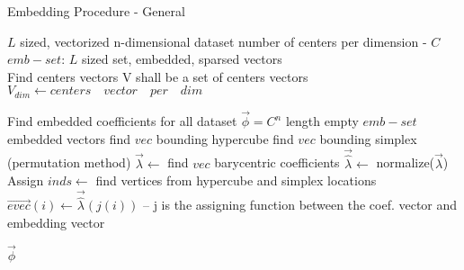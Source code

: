 \documentclass{article}
\begin{document}
	
	\begin{algorithm}
		\caption{Embedding Procedure - General}
		\begin{algorithmic}[1]
			
			\REQUIRE $L$ sized, vectorized n-dimensional dataset
			\REQUIRE number of centers per dimension - $C$
			\ENSURE $emb-set$: $L$ sized set, embedded, sparsed vectors\\
			
			\STATE Find centers vectors
			\STATE V shall be a set of centers vectors
			\STATE $V_{dim} \leftarrow centers \quad vector \quad per \quad dim$
			\ENDFOR
			
			\STATE Find embedded coefficients for all dataset
			\STATE $\overrightarrow{\phi} = C^n$ length empty $emb-set$ embedded vectors
			\STATE find $vec$ bounding hypercube 
			\STATE find $vec$ bounding simplex (permutation method)
			\STATE $\overrightarrow{\lambda} \leftarrow$ find $vec$ barycentric coefficients 
			\STATE $\overrightarrow{\hat{\lambda}} \leftarrow$ normalize($\overrightarrow{\lambda}$)
			\ENDFOR
			\STATE Assign
			\STATE $inds \leftarrow$ find vertices from hypercube and simplex locations
			\STATE $\overrightarrow{evec}(i) \leftarrow \overrightarrow{\hat{\lambda}}(j(i))$ -- j is the assigning function between the coef. vector and embedding vector
			\ENDFOR
			\ENDFOR
			
			\RETURN $\overrightarrow{\phi}$
			
		\end{algorithmic}
	\end{algorithm}
	
	
	
\end{document}
